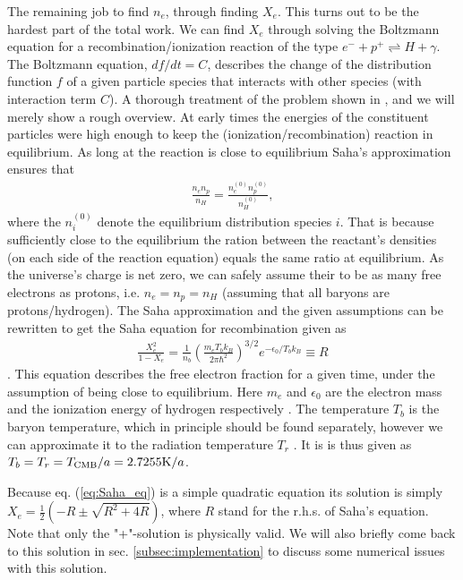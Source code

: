 \documentclass[twocolumn]{aastex62}
\begin{document}
The remaining job to find $n_e$, through finding $X_e$. This turns out to be the hardest part of the total work. We can find $X_e$ through solving the Boltzmann equation for a recombination/ionization reaction of the type $e^{-} + p^{+} \rightleftharpoons H + \gamma$. The Boltzmann equation, $df/dt = C$, describes the change of the distribution function $f$ of a given particle species that interacts with other species (with interaction term $C$). A thorough treatment of the problem shown in \cite{dodelson:2003}, and we will merely show a rough overview. At early times the energies of the constituent particles were high enough to keep the (ionization/recombination) reaction in equilibrium. As long at the reaction is close to equilibrium Saha's approximation \citep[p. 70]{dodelson:2003} ensures that 
\begin{align}
    \frac{n_e n_p}{n_H} = \frac{n_e^{(0)}n_p^{(0)}}{n_H^{(0)}},
\end{align}
where the $n_i^{(0)}$ denote the equilibrium distribution species $i$. That is because sufficiently close to the equilibrium the ration between the reactant's densities (on each side of the reaction equation) equals the same ratio at equilibrium. As the universe's charge is net zero, we can safely assume their to be as many free electrons as protons, i.e. $n_e = n_p = n_H$ (assuming that all baryons are protons/hydrogen). The Saha approximation and the given assumptions can be rewritten to get the Saha equation for recombination given as 
\begin{align}
    \frac{X_e^2}{1 - X_e} = \frac{1}{n_b} \left(\frac{m_e
    T_bk_B}{2\pi\hbar^2}\right)^{3/2} e^{-\epsilon_0/T_bk_B} \equiv R
    \label{eq:Saha_eq}
\end{align}
\citep[p. 70]{dodelson:2003}. This equation describes the free electron fraction for a given time, under the assumption of being close to equilibrium.
Here $m_e$ and $\epsilon_0$ are the electron mass and the ionization energy of hydrogen respectively \citep[]{winther:2020}. The temperature $T_b$ is the baryon temperature, which in principle should be found separately, however we can approximate it to the radiation temperature $T_r$ \citep[]{winther:2020}. It is is thus given as $T_b =
T_r = T_{\rm CMB} / a = 2.7255 \textrm{K} / a$.

Because eq. (\ref{eq:Saha_eq}) is a simple quadratic equation its solution is simply 
$X_e = \frac{1}{2} (-R \pm \sqrt{R^2 + 4R})$, where $R$ stand for the r.h.s. of Saha's equation. Note that only the "+"-solution is physically valid. We will also briefly come back to this solution in sec. \ref{subsec:implementation} to discuss some numerical issues with this solution.
\end{document}
